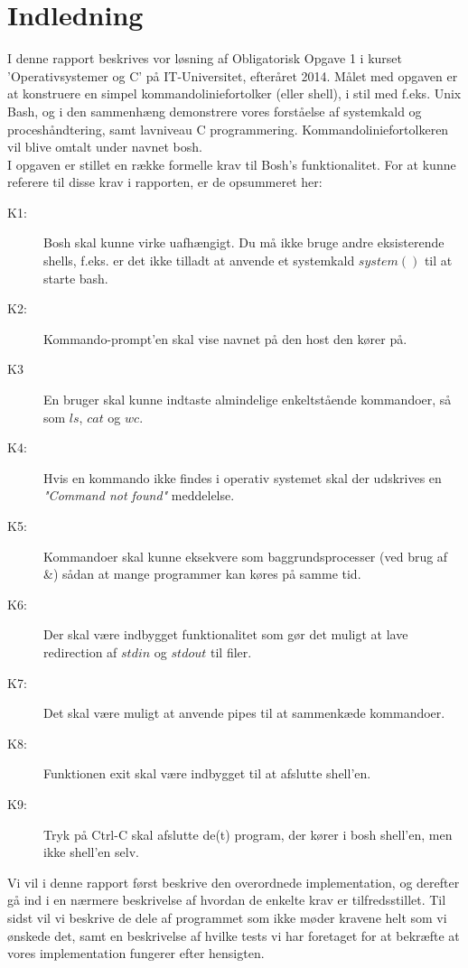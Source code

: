 \documentclass[final]{article}
\begin{document}

\tableofcontents
\pagebreak

\section{Indledning}
I denne rapport beskrives vor løsning af Obligatorisk Opgave 1 i kurset 'Operativsystemer og C' på IT-Universitet, efteråret 2014. Målet med opgaven er at konstruere en simpel kommandoliniefortolker (eller shell), i stil med f.eks. Unix Bash, og i den sammenhæng demonstrere vores forståelse af systemkald og proceshåndtering, samt lavniveau C programmering. Kommandoliniefortolkeren vil blive omtalt under navnet bosh.\\

I opgaven er stillet en række formelle krav til Bosh’s funktionalitet. For at kunne referere til disse krav i rapporten, er de opsummeret her:\\

\begin{description}
\item[K1:] Bosh skal kunne virke uafhængigt. Du må ikke bruge andre eksisterende shells, f.eks. er det ikke tilladt at anvende et systemkald $system()$ til at starte bash.
\item[K2:] Kommando-prompt'en skal vise navnet på den host den kører på.
\item[K3] En bruger skal kunne indtaste almindelige enkeltstående kommandoer, så som $ls$, $cat$ og $wc$. 
\item[K4:] Hvis en kommando ikke findes i operativ systemet skal der udskrives en \emph{"Command not found"} meddelelse.
\item[K5:] Kommandoer skal kunne eksekvere som baggrundsprocesser (ved brug af \&) sådan at mange programmer kan køres på samme tid.
\item[K6:] Der skal være indbygget funktionalitet som gør det muligt at lave redirection af $stdin$ og $stdout$ til filer. 
\item[K7:] Det skal være muligt at anvende pipes til at sammenkæde kommandoer. 
\item[K8:] Funktionen exit skal være indbygget til at afslutte shell'en.
\item[K9:] Tryk på Ctrl-C skal afslutte de(t) program, der kører i bosh shell'en, men ikke shell'en selv.
\end{description}

Vi vil i denne rapport først beskrive den overordnede implementation, og derefter gå ind i en nærmere beskrivelse af hvordan de enkelte krav er tilfredsstillet. Til sidst vil vi beskrive de dele af programmet som ikke møder kravene helt som vi ønskede det, samt en beskrivelse af hvilke tests vi har foretaget for at bekræfte at vores implementation fungerer efter hensigten.\\
\end{document}
